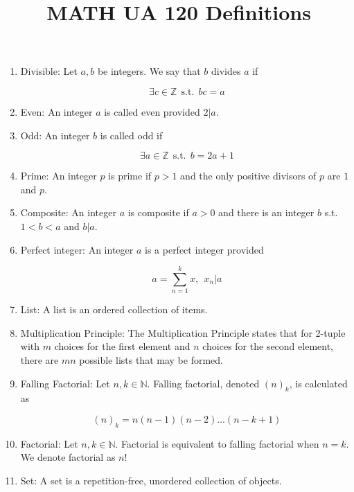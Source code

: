 \documentclass{article}
\title{MATH UA 120 Definitions}
\date{}
\begin{document}
\maketitle

\begin{enumerate}
    \item Divisible: Let $a,b$ be integers.
    We say that $b$ divides $a$ if

    \[\exists c\in\mathbb{Z}\:\: \text{s.t.} \:\: bc=a\]

    \item Even: An integer $a$ is called even provided $2|a$.
    
    \item Odd: An integer $b$ is called odd if
    
    \[\exists a\in\mathbb{Z} \:\: \text{s.t.} \:\: b=2a+1\]
    
    \item Prime: An integer $p$ is prime if $p>1$ and the only positive divisors of $p$ are $1$ and $p$.
    
    \item Composite: An integer $a$ is composite if $a>0$ and there is an integer $b$ s.t. $1<b<a$ and $b|a$.
    
    \item Perfect integer: An integer $a$ is a perfect integer provided 
    
    \[a=\sum_{n=1}^k x,\:\: x_n|a\]
    
    \item List: A list is an ordered collection of items.
    
    \item Multiplication Principle: The Multiplication Principle states that for 2-tuple with $m$ choices for the first element and $n$ choices for the second element, there are $mn$ possible lists that may be formed.
    
    \item Falling Factorial: Let $n,k\in\mathbb{N}$.
    Falling factorial, denoted $(n)_k$, is calculated as
    
    \[(n)_k=n(n-1)(n-2)\dots(n-k+1)\]
    
    \item Factorial: Let $n,k\in\mathbb{N}$.
    Factorial is equivalent to falling factorial when $n=k$.
    We denote factorial as $n!$
    
    \item Set: A set is a repetition-free, unordered collection of objects.
    

\end{enumerate}
\end{document}
